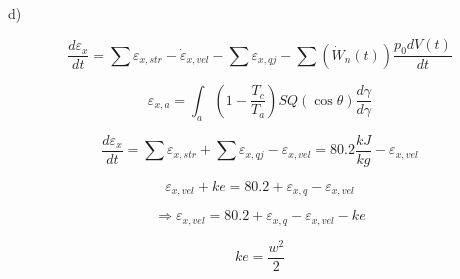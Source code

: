 d)

\[
\frac{d \varepsilon_x}{dt} = \sum \varepsilon_{x,str} - \dot{\varepsilon}_{x,vel} - \sum \varepsilon_{x,qj} - \sum \left( \dot{W}_n (t) \right) \frac{p_0 dV(t)}{dt}
\]

\[
\varepsilon_{x,a} = \int_a (1 - \frac{T_c}{T_a}) SQ \left( \cos \theta \right) \frac{d \gamma}{d \gamma}
\]

\[
\frac{d \varepsilon_x}{dt} = \sum \varepsilon_{x,str} + \sum \varepsilon_{x,qj} - \varepsilon_{x,vel} = 80.2 \frac{kJ}{kg} - \varepsilon_{x,vel}
\]

\[
\varepsilon_{x,vel} + ke = 80.2 + \varepsilon_{x,q} - \varepsilon_{x,vel}
\]

\[
\Rightarrow \varepsilon_{x,vel} = 80.2 + \varepsilon_{x,q} - \varepsilon_{x,vel} - ke
\]

\[
ke = \frac{w^2}{2}
\]